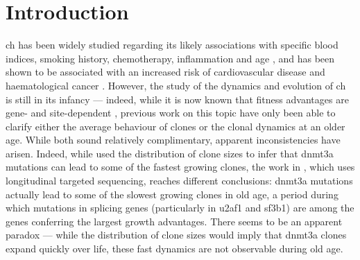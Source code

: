\section{Introduction}

\ac{ch} has been widely studied regarding its likely associations with specific blood indices, smoking history, chemotherapy, inflammation and age \cite{Dawoud2020-af,Coombs2017-ph,McKerrell2015-rl,Cai2018-yi,Bolton2020-ct}, and has been shown to be associated with an increased risk of cardiovascular disease and haematological cancer \cite{Jaiswal2014-rl,Genovese2014-eu, Young2016-du, Xie2014-np, Desai2018-pj, Midic2020-zh, Zink2017-zi, Acuna-Hidalgo2017-ng}. However, the study of the dynamics and evolution of \ac{ch} is still in its infancy --- indeed, while it is now known that fitness advantages are gene- and site-dependent \cite{Watson2020-pz,Robertson2021-sw}, previous work on this topic have only been able to clarify either the average behaviour of clones or the clonal dynamics at an older age. While both sound relatively complimentary, apparent inconsistencies have arisen. Indeed, while \cite{Watson2020-pz} used the distribution of clone sizes to infer that \ac{dnmt3a} mutations can lead to some of the fastest growing clones, the work in \cite{Robertson2021-sw}, which uses longitudinal targeted sequencing, reaches different conclusions: \ac{dnmt3a} mutations actually lead to some of the slowest growing clones in old age, a period during which mutations in splicing genes (particularly in \ac{u2af1} and \ac{sf3b1}) are among the genes conferring the largest growth advantages. There seems to be an apparent paradox --- while the distribution of clone sizes would imply that \ac{dnmt3a} clones expand quickly over life, these fast dynamics are not observable during old age. 

